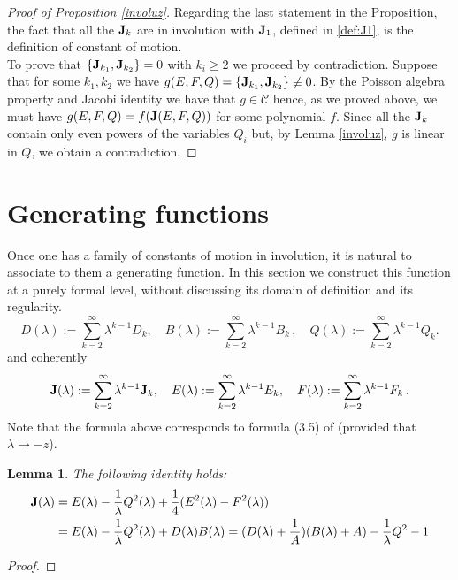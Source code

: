 \documentclass[reqno,11pt]{amsart}
\theoremstyle{plain}
\numberwithin{equation}{section}
\newtheorem{lemma}[theorem]{Lemma}
\newcommand{\I}{{\texttt{\bf J}}}
\begin{document}
{\begin{proof}[Proof of Proposition \ref{involuz}]
\smallskip
Regarding the last statement in the Proposition,
the fact that all the $\I_k$ are in involution with $\I_1$, defined in \eqref{def:J1}, is the definition of constant of motion. 
\\
To prove that $\{\I_{k_1},\I_{k_2}\} =0$  with $k_i\geq 2$ we proceed by contradiction. Suppose that for some $k_1,k_2$ we have
$g(E,F,Q)= \{\I_{k_1},\I_{k_2}\} \not\equiv 0$. By the Poisson algebra property and Jacobi identity  we have that $g\in \mathscr{C}$ hence, as we proved above, we must have $g(E,F,Q)= f(\I(E,F,Q)) $ for some polynomial $f$. Since all the $\I_k$ contain only even powers of the variables $Q_i$ but, by Lemma \ref{involuz}, $g$ is linear in $Q$, we obtain a contradiction.   
\end{proof}

\section{Generating functions}\label{gege}
Once one has a family of constants of motion in involution, it is natural to associate to them a generating function. In this section we construct this function at a purely formal level, without discussing its domain of definition and its regularity. 
\begin{equation}\label{EFQlambda}
	D(\lambda):= \sum_{k=2}^\infty \lambda^{k-1} D_k, \quad B(\lambda):= \sum_{k=2}^\infty \lambda^{k-1} B_k\,,
	\quad Q(\lambda):= \sum_{k=2}^\infty \lambda^{k-1} Q_k.
\end{equation} and coherently
\[
\I(\lambda):=\sum_{k=2}^\infty \lambda^{k-1} \I_k, \quad E(\lambda):= \sum_{k=2}^\infty \lambda^{k-1} E_k, \quad F(\lambda):= \sum_{k=2}^\infty \lambda^{k-1} F_k\,.
\]
Note that the formula above corresponds to formula (3.5) of \cite{campos} (provided that $\lambda\to -z$).
\begin{lemma}\label{lemma generating function}
	The following identity holds:
	\begin{equation}\label{generating function}
		\begin{aligned}
			\I(\lambda)&=E(\lambda)-\frac{1}{\lambda}Q^2(\lambda)+\frac{1}{4}(E^2(\lambda)-F^2(\lambda)) \\ &= E(\lambda) - \frac{1}{\lambda}Q^2(\lambda) + D(\lambda)B(\lambda)= (D(\lambda)+ \frac1A)(B(\lambda) +A) -\frac1\lambda Q^2-1
		\end{aligned}
	\end{equation}
\end{lemma}
\begin{proof}

\end{proof}}
\end{document}
